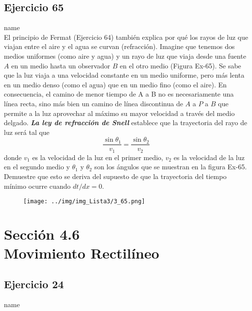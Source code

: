 \documentclass[12pt]{article}
\begin{document}
\subsection{Ejercicio 65} name \\

El principio de Fermat (Ejercicio 64) también explica por qué los rayos de luz que viajan entre el aire y el agua se curvan (refracción). Imagine que tenemos dos medios uniformes (como aire y agua) y un rayo de luz que viaja desde una fuente $A$ en un medio hasta un observador $B$ en el otro medio (Figura Ex-65). Se sabe que la luz viaja a una velocidad constante en un medio uniforme, pero más lenta en un medio denso (como el agua) que en un medio fino (como el aire). En consecuencia, el camino de menor tiempo de A a B no es necesariamente una línea recta, sino más bien un camino de línea discontinua de $A$ a $P$ a $B$ que permite a la luz aprovechar al máximo su mayor velocidad a través del medio delgado. \textit{\textbf{La ley de refracción de Snell}} establece que la trayectoria del rayo de luz será tal que
\[
\frac{\sin{\theta_1}}{v_1}=\frac{\sin{\theta_2}}{v_2}
\]
donde $v_1$ es la velocidad de la luz en el primer medio, $v_2$ es la velocidad de la luz en el segundo medio y $\theta_1$ y $\theta_2$ son los ángulos que se muestran en la figura Ex-65. Demuestre que esto se deriva del supuesto de que la trayectoria del tiempo mínimo ocurre cuando $dt /dx = 0$.
\begin{figure}[H]
\centering
\texttt{[image: ../img/img\_Lista3/3\_65.png]}
\end{figure}

\section{Sección 4.6 \\ Movimiento Rectilíneo}
\subsection{Ejercicio 24} name \\
\end{document}
